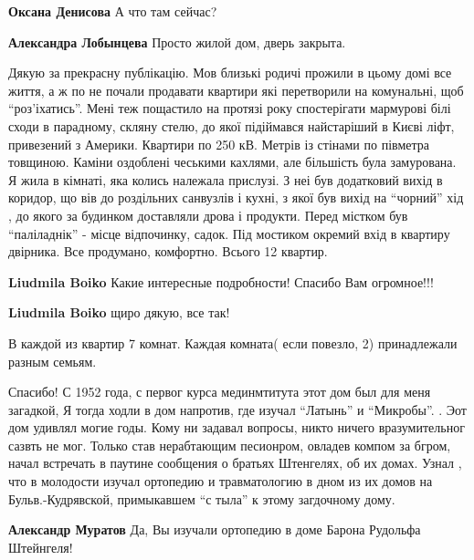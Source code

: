 \begin{itemize}
\begin{itemize}
\textbf{Оксана Денисова} А что там сейчас?

\textbf{Александра Лобынцева} Просто жилой дом, дверь закрыта.
\end{itemize} %


Дякую за прекрасну публікацію. Мов близькі родичі прожили в цьому домі все
життя, а ж по не почали продавати квартири які перетворили на комунальні, щоб
\enquote{роз'іхатись}. Мені теж пощастило на протязі року спостерігати
мармурові білі сходи в парадному, скляну стелю, до якої підіймався найстаріший
в Києві ліфт, привезений з Америки. Квартири по 250 кВ. Метрів із стінами по
півметра товщиною. Каміни оздоблені чеськими кахлями, але більшість була
замурована. Я жила в кімнаті, яка колись належала прислузі. З неі був
додатковий вихід в коридор, що вів до роздільних санвузлів і кухні, з якої був
вихід на \enquote{чорний} хід , до якого за будинком доставляли дрова і продукти. Перед
містком був \enquote{паліладнік} - місце відпочинку, садок. Під мостиком
окремий вхід в квартиру двірника. Все продумано, комфортно. Всього 12 квартир.

\begin{itemize} %
\textbf{Liudmila Boiko} Какие интересные подробности! Спасибо Вам огромное!!!

\textbf{Liudmila Boiko} щиро дякую, все так!

В каждой из квартир 7 комнат.
Каждая комната( если повезло, 2) принадлежали разным семьям.
\end{itemize} %


Спасибо! С 1952 года, с первог курса мединмтитута этот дом был для меня
загадкой, Я тогда ходли в дом напротив, где изучал \enquote{Латынь} и \enquote{Микробы}. . Эот
дом удивлял могие годы. Кому ни задавал вопросы, никто ничего вразумительног
сазвть не мог. Только став нерабтающим песионром, овладев компом за бгром,
начал встречать в паутине сообщения о братьях Штенгелях, об их домах. Узнал ,
что в молодости изучал ортопедию и травматологию в дном из их домов на
Бульв.-Кудрявской, примыкавшем \enquote{с тыла} к этому загдочному дому.

\begin{itemize} %
\textbf{Александр Муратов} Да, Вы изучали ортопедию в доме Барона Рудольфа Штейнгеля!


\end{itemize}
\end{itemize}
